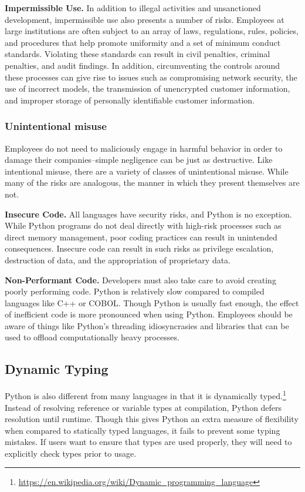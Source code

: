             \textbf{Impermissible Use.}
            In addition to illegal activities and unsanctioned development, impermissible use also presents a number of risks. Employees at large institutions are often subject to an array of laws, regulations, rules, policies, and procedures that help promote uniformity and a set of minimum conduct standards. Violating these standards can result in civil penalties, criminal penalties, and audit findings. In addition, circumventing the controls around these processes can give rise to issues such as compromising network security, the use of incorrect models, the transmission of unencrypted customer information, and improper storage of personally identifiable customer information.
 
        \subsubsection{Unintentional misuse}
 
            Employees do not need to maliciously engage in harmful behavior in order to damage their companies--simple negligence can be just as destructive. Like intentional misuse, there are a variety of classes of unintentional misuse. While many of the risks are analogous, the manner in which they present themselves are not.

            \textbf{Insecure Code.}
            All languages have security risks, and Python is no exception. While Python programs do not deal directly with high-risk processes such as direct memory management, poor coding practices can result in unintended consequences. Insecure code can result in such risks as privilege escalation, destruction of data, and the appropriation of proprietary data.
           
            \textbf{Non-Performant Code.}
            Developers must also take care to avoid creating poorly performing code. Python is relatively slow compared to compiled languages like C++ or COBOL. Though Python is usually fast enough, the effect of inefficient code is more pronounced when using Python. Employees should be aware of things like Python's threading idiosyncrasies and libraries that can be used to offload computationally heavy processes.
 
        \subsection{Dynamic Typing}

            Python is also different from many languages in that it is dynamically typed.\footnote{\url{https://en.wikipedia.org/wiki/Dynamic_programming_language}} Instead of resolving reference or variable types at compilation, Python defers resolution until runtime. Though this gives Python an extra measure of flexibility when compared to statically typed languages, it fails to prevent some typing mistakes. If users want to ensure that types are used properly, they will need to explicitly check types prior to usage.

